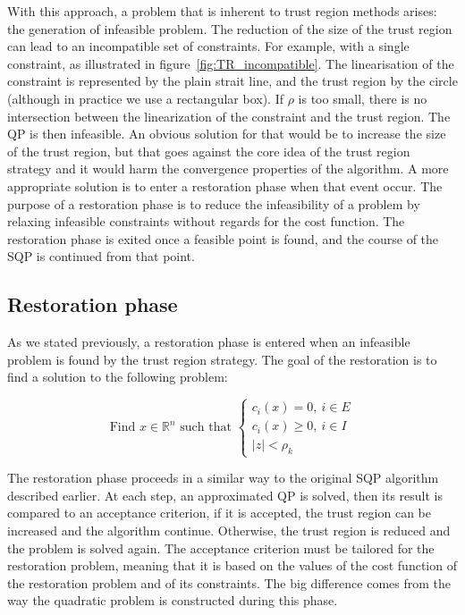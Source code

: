 With this approach, a problem that is inherent to trust region methods arises: the generation of infeasible problem.
The reduction of the size of the trust region can lead to an incompatible set of constraints.
For example, with a single constraint, as illustrated in figure~\ref{fig:TR_incompatible}.
The linearisation of the constraint is represented by the plain strait line, and the trust region by the circle (although in practice we use a rectangular box).
If $\rho$ is too small, there is no intersection between the linearization of the constraint and the trust region.
The QP is then infeasible.
An obvious solution for that would be to increase the size of the trust region, but that goes against the core idea of the trust region strategy and it would harm the convergence properties of the algorithm.
A more appropriate solution is to enter a restoration phase when that event occur.
The purpose of a restoration phase is to reduce the infeasibility of a problem by relaxing infeasible constraints without regards for the cost function.
The restoration phase is exited once a feasible point is found, and the course of the SQP is continued from that point.

\subsection{Restoration phase}
\label{sub:restoration_phase}

As we stated previously, a restoration phase is entered when an infeasible problem is found by the trust region strategy.
The goal of the restoration is to find a solution to the following problem:

\begin{equation}
    \text{Find $x\in\mathbb{R}^n$ such that }
    \left\{
    \begin{array}{l}
      c_i(x)=0,\ i\in E \\
      c_i(x)\geq 0,\ i\in I\\
      |z|<\rho_k
    \end{array}
    \right.
\label{eq:resto_NL}
\end{equation}

The restoration phase proceeds in a similar way to the original SQP algorithm described earlier.
At each step, an approximated QP is solved, then its result is compared to an acceptance criterion, if it is accepted, the trust region can be increased and the algorithm continue.
Otherwise, the trust region is reduced and the problem is solved again.
The acceptance criterion must be tailored for the restoration problem, meaning that it is based on the values of the cost function of the restoration problem and of its constraints.
The big difference comes from the way the quadratic problem is constructed during this phase.

